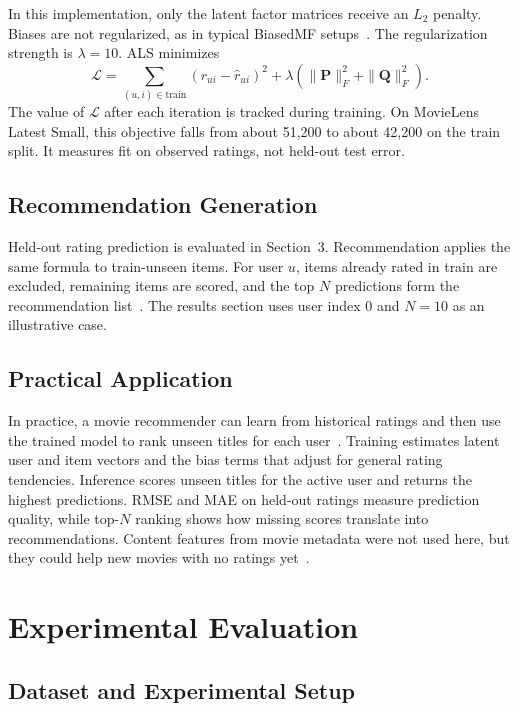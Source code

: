 \documentclass[conference]{IEEEtran}
\begin{document}
In this implementation, only the latent factor matrices receive an $L_2$ penalty. Biases are not regularized, as in typical BiasedMF setups~\cite{ref1,ref2}. The regularization strength is $\lambda = 10$. ALS minimizes
\begin{equation}
\mathcal{L} = \sum_{(u,i) \in \text{train}} \left( r_{ui} - \hat{r}_{ui} \right)^2 + \lambda \left( \|\mathbf{P}\|_F^2 + \|\mathbf{Q}\|_F^2 \right).
\end{equation}
The value of $\mathcal{L}$ after each iteration is tracked during training. On MovieLens Latest Small, this objective falls from about 51,200 to about 42,200 on the train split. It measures fit on observed ratings, not held-out test error.

\subsection{Recommendation Generation}

Held-out rating prediction is evaluated in Section~3. Recommendation applies the same formula to train-unseen items. For user $u$, items already rated in train are excluded, remaining items are scored, and the top $N$ predictions form the recommendation list~\cite{ref2,ref3,ref4}. The results section uses user index 0 and $N = 10$ as an illustrative case.

\subsection{Practical Application}

In practice, a movie recommender can learn from historical ratings and then use the trained model to rank unseen titles for each user~\cite{ref4}. Training estimates latent user and item vectors and the bias terms that adjust for general rating tendencies. Inference scores unseen titles for the active user and returns the highest predictions. RMSE and MAE on held-out ratings measure prediction quality, while top-$N$ ranking shows how missing scores translate into recommendations. Content features from movie metadata were not used here, but they could help new movies with no ratings yet~\cite{ref4,ref10}.

\section{Experimental Evaluation}

\subsection{Dataset and Experimental Setup}
\end{document}

